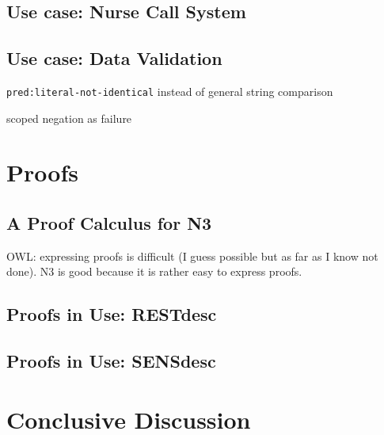 \documentclass[11pt,a4paper,twoside]{book}
\theoremstyle{remark}
\begin{document}
\chapter{Use case: Nurse Call System}\label{orca}
\chapter{Use case: Data Validation}\label{validation}

\texttt{pred:literal-not-identical} instead of general string comparison



scoped negation as failure
\part{Proofs}\label{proof}

\chapter{A Proof Calculus for N3}\label{cal}
OWL: expressing proofs is difficult (I guess possible but as far as I know not done). N3 is good because it is rather  easy to express proofs.
%
%
\chapter{Proofs in Use: RESTdesc}\label{restdesc}
\chapter{Proofs in Use: SENSdesc}\label{sensdesc}




\part{Conclusive Discussion}\label{conclusion}
\end{document}
